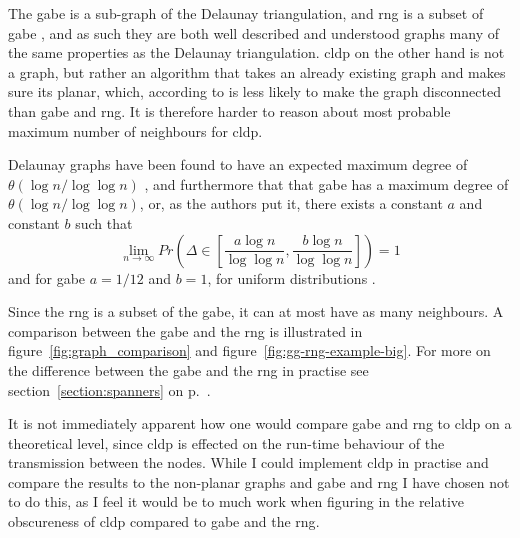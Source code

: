 The \ac{gabe} is a sub-graph of the Delaunay triangulation, and \ac{rng} is a subset of \ac{gabe} , and as such they are both well described and understood graphs many of the same properties as the Delaunay triangulation. \ac{cldp} on the other hand is not a graph, but rather an algorithm that takes an already existing graph and makes sure its planar, which, according to \cite{practical} is less likely to make the graph disconnected than \ac{gabe} and \ac{rng}. It is therefore harder to reason about most probable maximum number of neighbours for \ac{cldp}. 


Delaunay graphs have been found to have an expected maximum degree of $\theta(\log n / \log \log n)$ \cite{delExpected}, and furthermore that that \ac{gabe} has a maximum degree of $\theta(\log n / \log \log n)$, or, as the authors put it, there exists a constant $a$ and constant $b$ such that 
$$
\lim_{n \rightarrow \infty} Pr\left({\Delta \in \left[\frac{a\log n}{\log \log n}, \frac{b\log n}{\log \log n}\right]}\right) = 1
$$
and for \ac{gabe} $a = 1/12$ and $b = 1$, for uniform distributions \cite{GGExpected}.

Since the \ac{rng} is a subset of the \ac{gabe}, it can at most have as many neighbours. A comparison between the \ac{gabe} and the \ac{rng} is illustrated in figure~\ref{fig:graph_comparison} and figure~\ref{fig:gg-rng-example-big}. For more on the difference between the \ac{gabe} and the \ac{rng} in practise see section~\ref{section:spanners} on p.~\pageref{section:spanners}.


It is not immediately apparent how one would compare \ac{gabe} and \ac{rng} to \ac{cldp} on a theoretical level, since \ac{cldp} is effected on the run-time behaviour of the transmission between the nodes. While I could implement \ac{cldp} in practise and compare the results to the non-planar graphs and \ac{gabe} and \ac{rng} I have chosen not to do this, as I feel it would be to much work when figuring in the relative obscureness of \ac{cldp} compared to \ac{gabe} and the \ac{rng}.  

